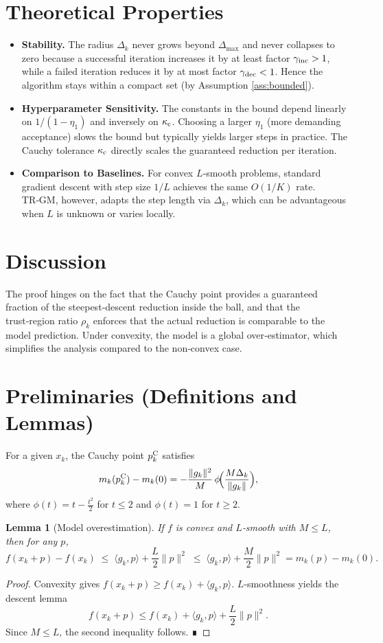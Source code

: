 \documentclass{article}
\newtheorem{lemma}{Lemma}
\begin{document}
\section*{Theoretical Properties}
\begin{itemize}
\item \textbf{Stability.} The radius $\Delta_k$ never grows beyond $\Delta_{\max}$ and never collapses to zero because a successful iteration increases it by at least factor $\gamma_{\rm inc}>1$, while a failed iteration reduces it by at most factor $\gamma_{\rm dec}<1$. Hence the algorithm stays within a compact set (by Assumption \ref{ass:bounded}).
\item \textbf{Hyperparameter Sensitivity.} The constants in the bound depend linearly on $1/(1-\eta_1)$ and inversely on $\kappa_{\rm c}$. Choosing a larger $\eta_1$ (more demanding acceptance) slows the bound but typically yields larger steps in practice. The Cauchy tolerance $\kappa_{\rm c}$ directly scales the guaranteed reduction per iteration.
\item \textbf{Comparison to Baselines.} For convex $L$‑smooth problems, standard gradient descent with step size $1/L$ achieves the same $O(1/K)$ rate. TR‑GM, however, adapts the step length via $\Delta_k$, which can be advantageous when $L$ is unknown or varies locally.
\end{itemize}

\section*{Discussion}
The proof hinges on the fact that the Cauchy point provides a guaranteed fraction of the steepest‑descent reduction inside the ball, and that the trust‑region ratio $\rho_k$ enforces that the actual reduction is comparable to the model prediction. Under convexity, the model is a global over‑estimator, which simplifies the analysis compared to the non‑convex case.

\section*{Preliminaries (Definitions and Lemmas)}
\begin{definition}
For a given $x_k$, the Cauchy point $p^{\rm C}_k$ satisfies
\[
m_k(p^{\rm C}_k)-m_k(0)= -\frac{\|g_k\|^2}{M}\,\phi\!\Bigl(\frac{M\Delta_k}{\|g_k\|}\Bigr),
\]
where $\phi(t)=t-\frac{t^2}{2}$ for $t\le 2$ and $\phi(t)=1$ for $t\ge2$.
\end{definition}
\begin{lemma}[Model overestimation]
\label{lem:over}
If $f$ is convex and $L$‑smooth with $M\le L$, then for any $p$,
\[
f(x_k+p)-f(x_k)\;\le\; \langle g_k,p\rangle+\frac{L}{2}\|p\|^2
\;\le\; \langle g_k,p\rangle+\frac{M}{2}\|p\|^2 = m_k(p)-m_k(0).
\]
\end{lemma}
\begin{proof}
Convexity gives $f(x_k+p)\ge f(x_k)+\langle g_k,p\rangle$.  
$L$‑smoothness yields the descent lemma
\[
f(x_k+p)\le f(x_k)+\langle g_k,p\rangle+\frac{L}{2}\|p\|^2 .
\]
Since $M\le L$, the second inequality follows. ∎
\end{proof}
\end{document}
